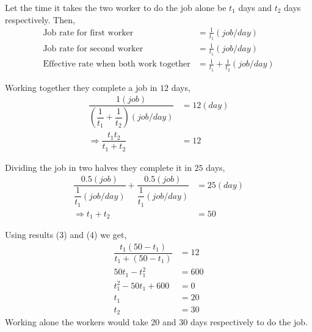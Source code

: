 \begin{solution}[\fullpage]
  Let the time it takes the two worker to do the job alone be $t_1$ days and $t_2$ days respectively. Then,
  \begin{align}
    \text{Job rate for first worker}  &= \frac{1}{t_1}(job/day) \nonumber \\
    \text{Job rate for second worker} &= \frac{1}{t_1}(job/day) \nonumber \\
    \text{Effective rate when both work together}     
    					&= \frac{1}{t_1}+\frac{1}{t_2}(job/day)
  \end{align}
  
  Working together they complete a job in $12$ days,
  \begin{align}
	\dfrac{1(job)}
		{\left(\dfrac{1}{t_1}+\dfrac{1}{t_2}\right)(job/day)} &= 12(day) \\
	\Rightarrow \dfrac{t_1t_2}{t_1+t_2}                       &= 12
  \end{align}
  
  Dividing the job in two halves they complete it in $25$ days,
  \begin{align}
    \dfrac{0.5(job)}{\dfrac{1}{t_1}(job/day)}+
    	\dfrac{0.5(job)}{\dfrac{1}{t_1}(job/day)} &= 25(day) \\
    \Rightarrow t_1+t_2                           &= 50
  \end{align}
  
  Using results (3) and (4) we get,
  \begin{align}
	\dfrac{t_1(50-t_1)}{t_1+(50-t_1)} &= 12 \\
    50t_1-t_1^2                     &= 600 \\
    t_1^2-50t_1+600                 &= 0 \\     
    t_1                             &= 20 \\
    t_2                             &= 30
  \end{align}
  Working alone the workers would take $20$ and $30$ days respectively to do the job.

\end{solution}


